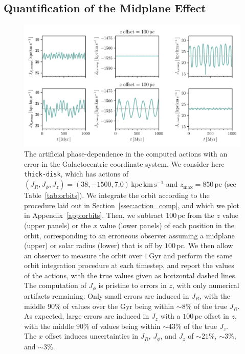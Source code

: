 \documentclass[twocolumn]{aastex62}
\newcommand{\pc}{\text{pc}}
\newcommand{\Gyr}{\text{Gyr}}
\newcommand{\kms}{\text{km}\,\text{s}^{-1}}
\newcommand{\actunit}{\text{kpc}\,\kms}
\newcommand{\thick}{\texttt{thick-disk}}
\begin{document}
\subsection{Quantification of the Midplane Effect} \label{ssec:quant}

\begin{figure}[ht!]
\begin{center}
\includegraphics[width=\textwidth]{fig/schmactions_one_orbit.pdf}
\end{center}
\caption{The artificial phase-dependence in the computed actions with an
error in the Galactocentric coordinate system. We consider here \thick{},
which has actions of $(J_R, J_{\phi}, J_z) = (38, -1500,
7.0)\,\actunit$ and $z_{\text{max}}=850\,\pc$ (see Table~\ref{tab:orbits}). We
integrate the orbit according to the procedure laid out in
Section~\ref{ssec:action_comp}, and which we plot in
Appendix~\ref{app:orbits}. Then, we subtract $100\,\pc$ from the $z$ value
(upper panels) or the $x$ value (lower panels) of each position in the orbit,
corresponding to an erroneous observer assuming a midplane (upper) or solar
radius (lower) that is off by $100\,\pc$. We then allow an observer
to measure the orbit over $1\,\Gyr$ and perform the same orbit integration
procedure at each timestep, and report the values of the actions, with the true values given as horizontal dashed lines. The
computation of $J_{\phi}$ is pristine to errors in $z$, with only numerical
artifacts remaining. Only small errors are induced in $J_R$, with the middle
$90\%$ of values over the $\Gyr$ being within $\sim8\%$ of the true $J_R$. As
expected, large errors are induced in $J_z$ with a $100\,\pc$ offset in $z$,
with the middle $90\%$ of values being within $\sim43\%$ of the true $J_z$.
The $x$ offset induces uncertainties in $J_R$, $J_{\phi}$, and $J_z$ of
$\sim21\%$, $\sim3\%$, and $\sim3\%$.}
\label{fig:one_orbit_wrong_ref}
\end{figure}
\end{document}
